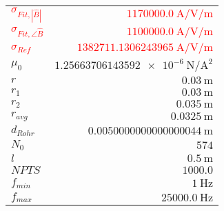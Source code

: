
{%
    \begin{center}
    \label{tab:fitparams:st:freq:approx2}
    \begin{tabular}{lr}
    \toprule
        \textcolor{red}{$\sigma_{Fit,|\hat{B}|}$} & \textcolor{red}{$\SI{1170000.0}{\ampere\per\volt\per\meter}$}\\
        \textcolor{red}{$\sigma_{Fit,\angle\hat{B}}$} & \textcolor{red}{$\SI{1100000.0}{\ampere\per\volt\per\meter}$}\\
        \textcolor{red}{$\sigma_{Ref}$} & \textcolor{red}{$\SI{1382711.1306243965}{\ampere\per\volt\per\meter}$}\\
        $\mu_0$ & $\SI{1.25663706143592e-6}{\newton\per\ampere\squared}$\\
        $r$ & $\SI{0.03}{\meter}$\\
        $r_1$ & $\SI{0.03}{\meter}$\\
        $r_2$ & $\SI{0.035}{\meter}$\\
        $r_{avg}$ & $\SI{0.0325}{\meter}$\\
        $d_{Rohr}$ & $\SI{0.0050000000000000044}{\meter}$\\
        $N_0$ & $\num{574}$\\
        $l$ & $\SI{0.5}{\meter}$\\
        $NPTS$ & $\num{1000.0}$\\
        $f_{min}$ & $\SI{1}{\hertz}$\\
        $f_{max}$ & $\SI{25000.0}{\hertz}$\\

    \bottomrule
    \end{tabular}
    \end{center}
}

